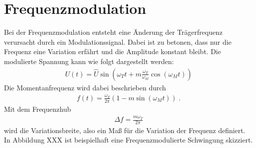 \section{Frequenzmodulation}
\label{sec:Frequenzmodulation}
Bei der Frequenzmodulation entsteht eine Änderung der Trägerfrequenz verursacht durch ein Modulationssignal. Dabei ist zu betonen, dass nur die Frequenz eine Variation erfährt und die Amplitude konstant bleibt. Die modulierte Spannung kann wie folgt dargestellt werden:
\begin{align}
	U(t)=\hat{U}\sin{\left(\omega_Tt+m\frac{\omega_T}{\omega_M}\cos{(\omega_Mt)}\right)}
\end{align}
Die Momentanfrequenz wird dabei beschrieben durch
\begin{align}
	f(t)=\frac{\omega_T}{2\pi}(1-m\sin{(\omega_Mt)})\;.
\end{align}
Mit dem Frequenzhub
\begin{align}
	\Delta f=\frac{m\omega_T}{2\pi}
\end{align}
wird die Variationsbreite, also ein Maß für die Variation der Frequenz definiert. In Abbildung XXX ist beispielhaft eine Frequenzmodulierte Schwingung skizziert.


